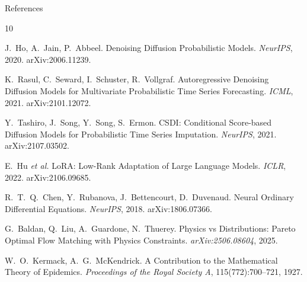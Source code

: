 \documentclass[10pt]{beamer}
\begin{document}
\begin{frame}[allowframebreaks]{References}
  \begin{thebibliography}{10}

   J.~Ho, A.~Jain, P.~Abbeel.
    \newblock Denoising Diffusion Probabilistic Models.
    \newblock \emph{NeurIPS}, 2020. arXiv:2006.11239.

   K.~Rasul, C.~Seward, I.~Schuster, R.~Vollgraf.
    \newblock Autoregressive Denoising Diffusion Models for Multivariate
    Probabilistic Time Series Forecasting.
    \newblock \emph{ICML}, 2021. arXiv:2101.12072.

   Y.~Tashiro, J.~Song, Y.~Song, S.~Ermon.
    \newblock CSDI: Conditional Score-based Diffusion Models for
    Probabilistic Time Series Imputation.
    \newblock \emph{NeurIPS}, 2021. arXiv:2107.03502.

   E.~Hu {\it et al.}
    \newblock LoRA: Low-Rank Adaptation of Large Language Models.
    \newblock \emph{ICLR}, 2022. arXiv:2106.09685.

   R.~T.~Q.~Chen, Y.~Rubanova, J.~Bettencourt,
    D.~Duvenaud.
    \newblock Neural Ordinary Differential Equations.
    \newblock \emph{NeurIPS}, 2018. arXiv:1806.07366.

   G.~Baldan, Q.~Liu, A.~Guardone, N.~Thuerey.
    \newblock Physics vs Distributions: Pareto Optimal Flow Matching with
    Physics Constraints.
    \newblock \emph{arXiv:2506.08604}, 2025.

   W.~O.~Kermack, A.~G.~McKendrick.
    \newblock A Contribution to the Mathematical Theory of Epidemics.
    \newblock \emph{Proceedings of the Royal Society A}, 115(772):700--721,
    1927.

  \end{thebibliography}
\end{frame}

\appendix
\end{document}

